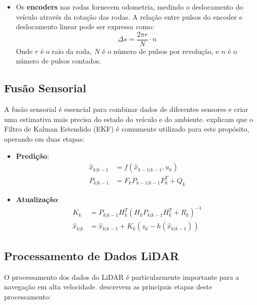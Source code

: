 \begin{itemize}
    \item Os \textbf{encoders} nas rodas fornecem odometria, medindo o deslocamento do
          veículo através da rotação das rodas. A relação entre pulsos do encoder e
          deslocamento linear pode ser expressa como:
          \begin{equation}
              \Delta s = \frac{2\pi r}{N} \cdot n
              \label{eq:encoder_displacement}
          \end{equation}
          Onde $r$ é o raio da roda, $N$ é o número de pulsos por revolução, e $n$ é o número de pulsos contados.
\end{itemize}

\subsection{Fusão Sensorial}

A fusão sensorial é essencial para combinar dados de diferentes sensores e
criar uma estimativa mais precisa do estado do veículo e do ambiente.
\cite{Babu2020Simulator} explicam que o Filtro de Kalman Estendido (EKF) é
comumente utilizado para este propósito, operando em duas etapas:

\begin{itemize}
    \item \textbf{Predição}:
          \begin{align}
              \hat{x}_{k|k-1} & = f(\hat{x}_{k-1|k-1}, u_k) \label{eq:ekf_prediction_state}        \\
              P_{k|k-1}       & = F_k P_{k-1|k-1} F_k^T + Q_k \label{eq:ekf_prediction_covariance}
          \end{align}

    \item \textbf{Atualização}:
          \begin{align}
              K_k           & = P_{k|k-1} H_k^T (H_k P_{k|k-1} H_k^T + R_k)^{-1} \label{eq:ekf_update_gain} \\
              \hat{x}_{k|k} & = \hat{x}_{k|k-1} + K_k(z_k - h(\hat{x}_{k|k-1})) \label{eq:ekf_update_state}
          \end{align}
\end{itemize}

\subsection{Processamento de Dados LiDAR}

O processamento dos dados do LiDAR é particularmente importante para a
navegação em alta velocidade. \cite{Wang2020LMPC} descrevem as principais
etapas deste processamento:

